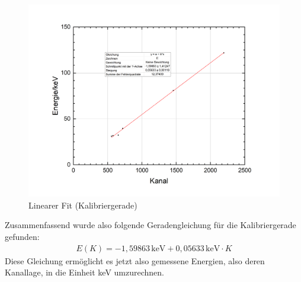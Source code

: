 \documentclass[german,  %
parskip=full,  %
]{scrartcl}
\begin{document}
\newpage
\begin{figure}[h!]\centering
\includegraphics[scale=0.6]{kalibrierung}
\caption{Linearer Fit (Kalibriergerade)}
\end{figure}
Zusammenfassend wurde also folgende Geradengleichung für die Kalibriergerade gefunden:
\begin{align}
E(K) = -1,59863 \,  \text{keV} + 0,05633 \, \text{keV} \cdot K
\end{align}
Diese Gleichung ermöglicht es jetzt also gemessene Energien, also deren Kanallage, in die Einheit keV umzurechnen.
\newpage
\end{document}
